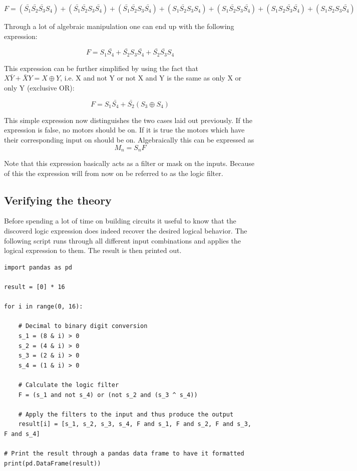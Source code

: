\documentclass[14pt]{article}
\begin{document}
$$
F = (\bar{S_1}\bar{S_2}\bar{S_3}S_4)+(\bar{S_1}\bar{S_2}S_3\bar{S_4})+(\bar{S_1}\bar{S_2}S_3\bar{S_4})+(S_1\bar{S_2}S_3S_4)+(S_1\bar{S_2}S_3\bar{S_4})+(S_1S_2\bar{S_3}\bar{S_4})+(S_1S_2S_3\bar{S_4})
$$

Through a lot of algebraic manipulation one can end up with the following expression:

$$
F = S_1\bar{S_4} + \bar{S_2}S_3\bar{S_4}+\bar{S_2}\bar{S_3}S_4
$$

This expression can be further simplified by using the fact that $X\bar{Y}+\bar{X}Y = X \oplus Y$, i.e. X and not Y or not X and Y is the same
as only X or only Y (exclusive OR):

\begin{equation}
F = S_1\bar{S_4} + \bar{S_2}(S_3 \oplus S_4)
\label{eq:logic_filter}
\end{equation}

This simple expression now distinguishes the two cases laid out previously. If the expression is false, no motors should be on. If it is true
the motors which have their corresponding input on should be on. Algebraically this can be expressed as 
\begin{equation}
M_n = S_nF
\label{eq:apply_filter}
\end{equation}

Note that this expression basically acts as a filter or mask on
the inputs. Because of this the expression will from now on be referred to as the logic filter.


\clearpage
\subsection{Verifying the theory}

Before spending a lot of time on building circuits it useful to know that the discoverd logic expression does indeed recover the desired logical behavior.
The following script runs through all different input combinations and applies the logical expression to them. The result is then printed out.

\begin{verbatim}
import pandas as pd

result = [0] * 16

for i in range(0, 16):

    # Decimal to binary digit conversion
    s_1 = (8 & i) > 0
    s_2 = (4 & i) > 0
    s_3 = (2 & i) > 0
    s_4 = (1 & i) > 0
    
    # Calculate the logic filter
    F = (s_1 and not s_4) or (not s_2 and (s_3 ^ s_4))

    # Apply the filters to the input and thus produce the output
    result[i] = [s_1, s_2, s_3, s_4, F and s_1, F and s_2, F and s_3, F and s_4]

# Print the result through a pandas data frame to have it formatted
print(pd.DataFrame(result))
\end{verbatim}
\end{document}
